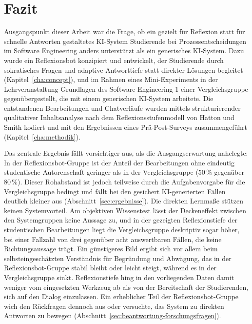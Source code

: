 \chapter{Fazit}
\label{chap:fazit}

Ausgangspunkt dieser Arbeit war die Frage, ob ein gezielt für Reflexion statt für schnelle Antworten
gestaltetes KI-System Studierende bei Prozessentscheidungen im Software Engineering anders
unterstützt als ein generisches KI-System. Dazu wurde ein Reflexionsbot konzipiert und entwickelt,
der Studierende durch sokratisches Fragen und adaptive Antworttiefe statt direkter Lösungen begleitet
(Kapitel~\ref{cha:concept}), und im Rahmen eines Mini-Experiments in der Lehrveranstaltung
\glqq Grundlagen des Software Engineering 1\grqq{} einer Vergleichsgruppe gegenübergestellt, die mit
einem generischen KI-System arbeitete. Die entstandenen Bearbeitungen und Chatverläufe wurden mittels
strukturierender qualitativer Inhaltsanalyse nach dem Reflexionsstufenmodell von Hatton und Smith
kodiert und mit den Ergebnissen eines Prä-Post-Surveys zusammengeführt (Kapitel~\ref{cha:methodik}).

Das zentrale Ergebnis fällt vorsichtiger aus, als die Ausgangserwartung nahelegte: In der
Reflexionsbot-Gruppe ist der Anteil der Bearbeitungen ohne eindeutig studentische Autorenschaft
geringer als in der Vergleichsgruppe (50\,\% gegenüber 80\,\%). Dieser Rohabstand ist jedoch teilweise
durch die Aufgabenvorgabe für die Vergleichsgruppe bedingt und fällt bei den gesichert KI-generierten
Fällen deutlich kleiner aus (Abschnitt~\ref{sec:ergebnisse}). Die direkten Lernmaße stützen keinen
Systemvorteil. Am objektiven Wissenstest lässt der Deckeneffekt zwischen den Systemgruppen keine
Aussage zu, und in der gezeigten Reflexionstiefe der studentischen Bearbeitungen liegt die
Vergleichsgruppe deskriptiv sogar höher, bei einer Fallzahl von drei gegenüber acht auswertbaren
Fällen, die keine Richtungsaussage trägt. Ein günstigeres Bild ergibt sich vor allem beim
selbsteingeschätzten Verständnis für Begründung und Abwägung, das in der Reflexionsbot-Gruppe stabil
bleibt oder leicht steigt, während es in der Vergleichsgruppe sinkt. Reflexionstiefe hing in den
vorliegenden Daten damit weniger vom eingesetzten Werkzeug ab als von der Bereitschaft der
Studierenden, sich auf den Dialog einzulassen. Ein erheblicher Teil der Reflexionsbot-Gruppe wich den
Rückfragen dennoch aus oder versuchte, das System zu direkten Antworten zu bewegen
(Abschnitt~\ref{sec:beantwortung-forschungsfragen}).

